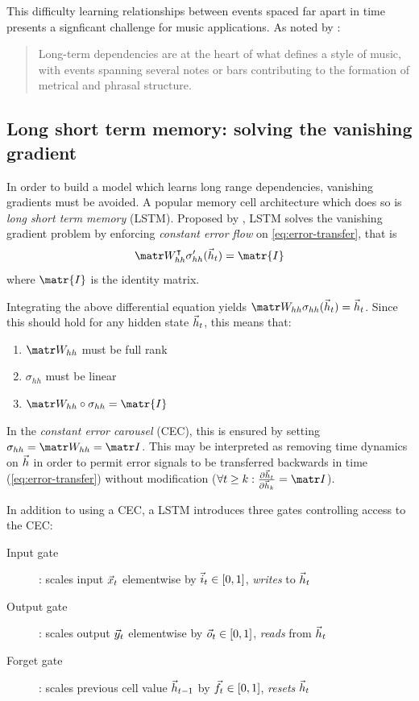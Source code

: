 This difficulty learning relationships between events spaced far apart in time
presents a signficant challenge for music applications. As noted by
\citet{cooper1963rhythmic}:
\begin{quote}
  Long-term dependencies are at the heart of what defines a style of music, with
  events spanning several notes or bars contributing to the formation of metrical and phrasal
  structure.
\end{quote}

\subsection{Long short term memory: solving the vanishing gradient}

In order to build a model which learns long range dependencies, vanishing
gradients must be avoided. A popular memory cell architecture which does so is
\emph{long short term memory} (LSTM). Proposed by \citet{hochreiter1997long},
LSTM solves the vanishing gradient problem by enforcing \emph{constant error
flow} on \cref{eq:error-transfer}, that is
\begin{equation}
    \W_{hh}^\tp \sigma_{hh}' (\h_{t}) = \matr{I}
\end{equation}
where $\matr{I}$ is the identity matrix.

Integrating the above differential equation yields $\W_{hh} \sigma_{hh}(\h_{t}) = \h_{t}$.
Since this should hold for any hidden state $\vec{h}_{t}$, this means that:
\begin{enumerate}
    \item $\W_{hh}$ must be full rank
    \item $\sigma_{hh}$ must be linear
    \item $\W_{hh} \circ \sigma_{hh} = \matr{I}$
\end{enumerate}

In the \emph{constant error carousel} (CEC), this is ensured by setting
$\sigma_{hh} = \W_{hh} = \I$. This may be interpreted as removing time dynamics
on $\vec{h}$ in order to permit error signals to be transferred backwards in time
(\cref{eq:error-transfer}) without modification (\ie $\forall t \geq k: \frac{\pd
\h_t}{\pd \h_k} = \I$).

In addition to using a CEC, a LSTM introduces three gates controlling access to the CEC:
\begin{description}
  \item[Input gate]: scales input $\vec{x}_t$ elementwise by $\vec{i}_t \in [0,1]$, \emph{writes} to $\vec{h}_t$
  \item[Output gate]: scales output $\vec{y}_t$ elementwise by $\vec{o}_t \in [0,1]$, \emph{reads} from $\vec{h}_t$
  \item[Forget gate]: scales previous cell value $\vec{h}_{t-1}$ by $\vec{f}_t \in [0,1]$, \emph{resets} $\vec{h}_t$
\end{description}

